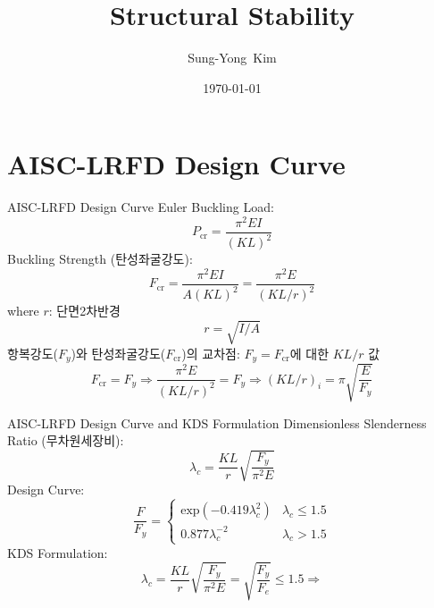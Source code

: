 \documentclass[9pt]{beamer}
\title{Structural Stability}
\author{Sung-Yong~Kim\inst{1}}
\institute[Changwon National University] %
{
	\inst{1}%
	Associate Professor, School of Architecture\\
	Changwon National University}
\date{\today}
\begin{document}
\begin{frame}
	\titlepage
\end{frame}

\section{AISC-LRFD Design Curve}

\begin{frame}{AISC-LRFD Design Curve}
	Euler Buckling Load:
\[P_\mathrm{cr} = \frac{\pi^2 EI}{(KL)^2}\]
	Buckling Strength (탄성좌굴강도):
\[F_\mathrm{cr} = \frac{\pi^2 EI}{A(KL)^2} = \frac{\pi^2 E}{(KL/r)^2}\]
where $r$: 단면2차반경
\[r = \sqrt{I/A}\]
	항복강도($F_y$)와 탄성좌굴강도($F_\mathrm{cr}$)의 교차점: $F_y=F_\mathrm{cr}$에 대한 $KL/r$ 값
\[F_\mathrm{cr} = F_y \Rightarrow \frac{\pi^2 E}{(KL/r)^2} = F_y \Rightarrow (KL/r)_i = \pi\sqrt{\frac{E}{F_y}}\]
\end{frame}

\begin{frame}{AISC-LRFD Design Curve and KDS Formulation}
	Dimensionless Slenderness Ratio (무차원세장비):
\[\lambda_c = \frac{KL}{r}\sqrt{\frac{F_y}{\pi^2 E}}\]
	Design Curve:
\[\frac{F}{F_y} = \begin{cases}\mathrm{exp}(-0.419\lambda_c^2) & \lambda_c \leq 1.5 \\
							   0.877\lambda_c^{-2} & \lambda_c>1.5\end{cases}\]
	KDS Formulation:
\[\lambda_c = \frac{KL}{r}\sqrt{\frac{F_y}{\pi^2 E}} = \sqrt{\frac{F_y}{F_e}} \leq 1.5 \Rightarrow \]
\end{frame}
\end{document}
